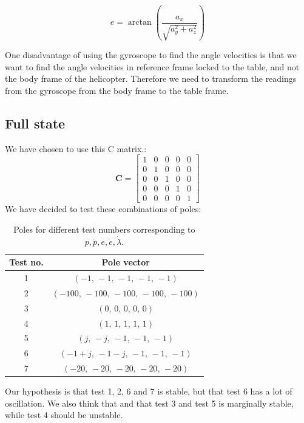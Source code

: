 \begin{equation}
    e = \arctan\left( \frac{a_x}{\sqrt{a_y^2 + a_z^2}} \right)
\end{equation}


One disadvantage of using the gyroscope to find the angle velocities is that we want to find the angle velocities in reference frame locked to the table, and not the body frame of the helicopter.  Therefore we need to transform the readings from the gyroscope from the body frame to the table frame.

\subsection{Full state}
 We have chosen to use this C matrix.:
 \begin{equation}
    \mathbf{C}=
    \begin{bmatrix}
        1&0&0&0&0\\
        0&1&0&0&0\\
        0&0&1&0&0\\
        0&0&0&1&0\\
        0&0&0&0&1
    \end{bmatrix}
\end{equation}
We have decided to test these combinations of poles:
\begin{table}[h!]
    \centering
    \begin{tabular}{c|c}
        \textbf{Test no.} & \textbf{Pole vector} \\
        \hline
        1 & $(-1,\,-1,\,-1,\,-1,\,-1)$ \\
        2 & $(-100,\,-100,\,-100,\,-100,\,-100)$ \\
        3 & $(0,\,0,\,0,\,0,\,0)$ \\
        4 & $(1,\,1,\,1,\,1,\,1)$ \\
        5 & $(j,\,-j,\,-1,\,-1,\,-1)$ \\
        6 & $(-1 +j,\,-1 -j,\,-1,\,-1,\,-1)$ \\
        7 & $(-20,\,-20,\,-20,\,-20,\,-20)$ \\
    \end{tabular}
    \caption{Poles for different test numbers corresponding to $p, \dot{p}, e, \dot{e}, \dot{\lambda}$.}
    \label{tab:poles}
\end{table}

Our hypothesis is that test 1, 2, 6 and 7 is stable, but that test 6 has a lot of oscillation. We also think that and that test 3 and test 5 is marginally stable, while test 4 should be unstable.

